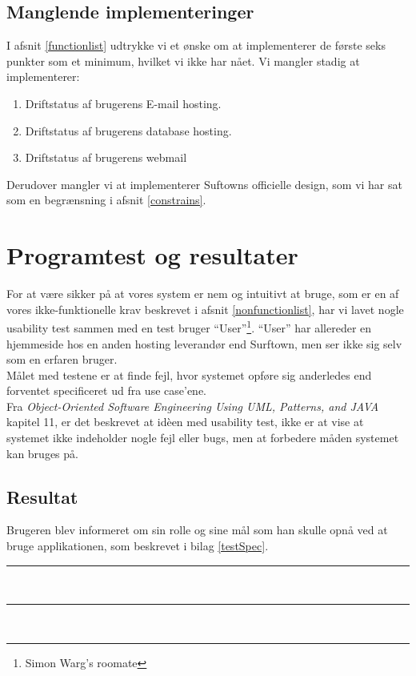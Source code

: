 \documentclass[12pt]{article}
\begin{document}
\subsection*{Manglende implementeringer}
I afsnit \ref{functionlist} udtrykke vi et ønske om at implementerer de første seks punkter som et minimum, hvilket vi ikke har nået. Vi mangler stadig at implementerer:
\begin{enumerate}
	\item Driftstatus af brugerens E-mail hosting.
	\item Driftstatus af brugerens database hosting.
	\item Driftstatus af brugerens webmail
\end{enumerate}
Derudover mangler vi at implementerer Suftowns officielle design, som vi har sat som en begrænsning i afsnit \ref{constrains}.
\section{Programtest og resultater}
For at være sikker på at vores system er nem og intuitivt at bruge, som er en af vores ikke-funktionelle krav beskrevet i afsnit \ref{nonfunctionlist}, har vi lavet nogle usability test sammen med en test bruger ``User''\footnote{Simon Warg's roomate}. ``User'' har allereder en hjemmeside hos en anden hosting leverandør end Surftown, men ser ikke sig selv som en erfaren bruger.\\
Målet med testene er at finde fejl, hvor systemet opføre sig anderledes end forventet specificeret ud fra use case'ene.\\
Fra \emph{Object-Oriented Software Engineering Using UML, Patterns, and JAVA}\cite{OOSE} kapitel 11, er det beskrevet at idèen med usability test, ikke er at vise at systemet ikke indeholder nogle fejl eller bugs, men at forbedere måden systemet kan bruges på.
\subsection{Resultat}
Brugeren blev informeret om sin rolle og sine mål som han skulle opnå ved at bruge applikationen, som beskrevet i bilag \ref{testSpec}.\\
        \rule{430pt}{1.0pt}
        \\
        \rule{430pt}{0.4pt}
        \\
	
\end{document}
